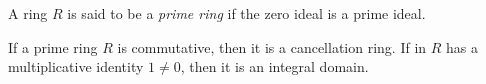 \documentclass{article}
\begin{document}
A ring $R$ is said to be a \emph{prime ring} if the zero ideal is a prime ideal.

If a prime ring $R$ is commutative, then it is a cancellation ring.  If in  $R$ has a multiplicative identity $1 \neq 0$, then it is an integral domain.
\end{document}
